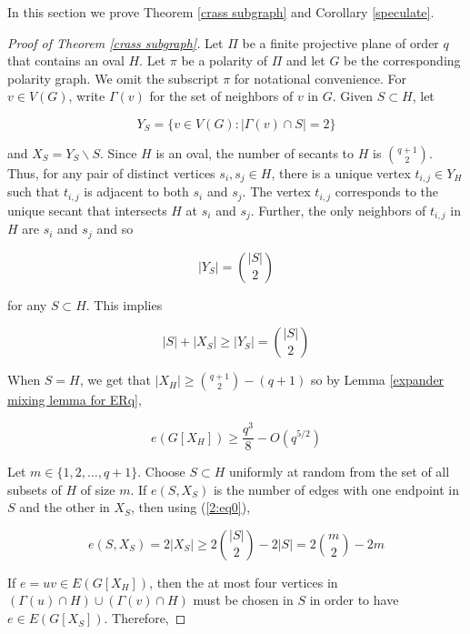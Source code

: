 \documentclass[12pt]{article}
\begin{document}
In this section we prove Theorem \ref{crass subgraph} and Corollary \ref{speculate}.


\begin{proof}[Proof of Theorem \ref{crass subgraph}]
    Let $\Pi$ be a finite projective plane of order $q$ that contains an oval $H$.  Let $\pi$ be a polarity of $\Pi$ and let $G$ be the corresponding polarity graph.  We omit the subscript $\pi$ for notational convenience.  For $v \in V(G)$, write $\Gamma (v)$ for the set of neighbors of $v$ in $G$.  Given $S \subset H$, let

    $$ Y_S = \{ v \in V(G) : | \Gamma (v) \cap S | = 2 \} $$

    and $X_S = Y_S \backslash S$.  Since $H$ is an oval, the number of secants to $H$ is $\binom{q+1}{2}$.
    Thus, for any pair of distinct vertices $s_i , s_j \in H$, there is a unique vertex $t_{i,j} \in Y_H$ such that
    $t_{i,j}$ is adjacent to both $s_i$ and $s_j$.  The vertex $t_{i,j}$ corresponds to the unique secant that intersects $H$ at
    $s_i$ and $s_j$.  Further, the only neighbors of $t_{i,j}$ in $H$ are $s_i$ and $s_j$ and so

    $$ |Y_S | = \binom{ |S| }{2} $$

    for any $S \subset H$.  This implies

    \begin{equation}\label{2:eq0}
        |S| + |X_S| \geq |Y_S| = \binom{ |S| }{2}
    \end{equation}

    When $S = H$, we get that $|X_H| \geq \binom{q+1}{2}  - (q  + 1)$ so by Lemma \ref{expander mixing lemma for ERq},

    \begin{equation}\label{22:eq1}
        e( G[ X_H] ) \geq \frac{q^3}{8} - O (q^{5/2})
    \end{equation}

    Let $m \in \{ 1,2 , \dots ,  q + 1 \}$.  Choose $S \subset H$ uniformly at random from the set of all subsets of $H$ of size $m$.  If
    $e(S , X_S)$ is the number of edges with one endpoint in $S$ and the other in $X_S$, then using (\ref{2:eq0}),

    \begin{equation}\label{2:eq1}
        e(S , X_S) = 2 |X_S| \geq 2 \binom{ |S| }{2} - 2 |S| = 2 \binom{m}{2} - 2m
    \end{equation}

    If $e = uv \in E( G[X_H] )$, then the at most four vertices in $( \Gamma (u) \cap H ) \cup ( \Gamma (v) \cap H )$ must be chosen in $S$ in order to have $e \in E( G [ X_S] )$.  Therefore,


\end{proof}
\end{document}
